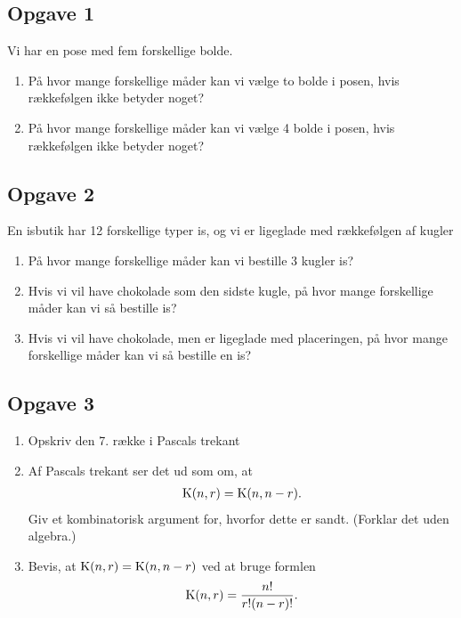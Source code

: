 \subsection*{Opgave 1}
Vi har en pose med fem forskellige bolde. 
\begin{enumerate}[label=\roman*)]
	\item På hvor mange forskellige måder kan vi vælge to bolde i posen, hvis rækkefølgen ikke betyder noget?
	\item På hvor mange forskellige måder kan vi vælge 4 bolde i posen, hvis rækkefølgen ikke betyder noget?
\end{enumerate}

\subsection*{Opgave 2}
En isbutik har 12 forskellige typer is, og vi er ligeglade med rækkefølgen af kugler
\begin{enumerate}[label=\roman*)]
	\item På hvor mange forskellige måder kan vi bestille 3 kugler is?
	\item Hvis vi vil have chokolade som den sidste kugle, på hvor mange forskellige måder kan vi så bestille is?
	\item Hvis vi vil have chokolade, men er ligeglade med placeringen, på hvor mange forskellige måder kan vi så
	 bestille en is?
\end{enumerate}

\subsection*{Opgave 3}
\begin{enumerate}[label=\roman*)]
	\item Opskriv den 7. række i Pascals trekant
	\item Af Pascals trekant ser det ud som om, at 
	\begin{align*}
		\textnormal{K}(n,r) = \textnormal{K}(n,n-r).
	\end{align*}
	Giv et kombinatorisk argument for, hvorfor dette er sandt. (Forklar det uden algebra.)
	\item Bevis, at $\textnormal{K}(n,r) = \textnormal{K}(n,n-r)$ ved at bruge formlen
	\begin{align*}
		\textnormal{K}(n,r) = \frac{n!}{r!(n-r)!}.
	\end{align*}
\end{enumerate}

